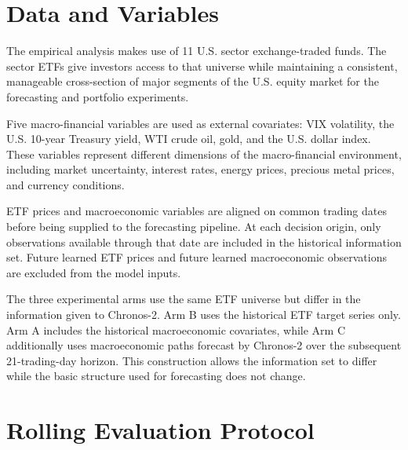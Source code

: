 \documentclass[12pt,a4paper,twoside,openany]{book}
\begin{document}
\section{Data and Variables}\label{data-and-variables}

The empirical analysis makes use of 11 U.S. sector exchange-traded funds. The sector ETFs give investors access to that universe while maintaining a consistent, manageable cross-section of major segments of the U.S. equity market for the forecasting and portfolio experiments.

Five macro-financial variables are used as external covariates:
VIX volatility, the U.S. 10-year Treasury yield, WTI crude oil,
gold, and the U.S. dollar index. These variables represent different
dimensions of the macro-financial environment, including market
uncertainty, interest rates, energy prices, precious metal prices,
and currency conditions.

ETF prices and macroeconomic variables are aligned on common trading dates before being supplied to the forecasting pipeline. At each
decision origin, only observations available through that date are
included in the historical information set. Future learned ETF prices and future learned macroeconomic observations are excluded
from the model inputs.

The three experimental arms use the same ETF universe but differ in
the information given to Chronos-2. Arm B uses the historical ETF
target series only. Arm A includes the historical macroeconomic
covariates, while Arm C additionally uses macroeconomic paths
forecast by Chronos-2 over the subsequent 21-trading-day horizon.
This construction allows the information set to differ while the
basic structure used for forecasting does not change.

\section{Rolling Evaluation
Protocol}\label{rolling-evaluation-protocol}
\end{document}
